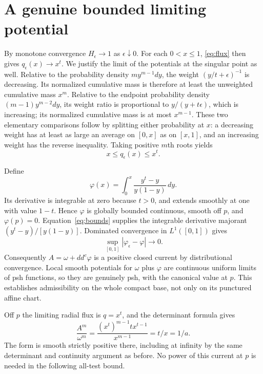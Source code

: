 \documentclass[11pt]{article}
\newcommand{\ddc}{dd^c}
\theoremstyle{remark}\newtheorem{remark}[theorem]{Remark}
\begin{document}
\section{A genuine bounded limiting potential}
By monotone convergence $H_\epsilon\to1$ as $\epsilon\downarrow0$.
For each $0<x\leq1$, \eqref{eq:flux} then gives
$q_\epsilon(x)\to x^t$.
We justify the limit of the potentials at the singular point as well.
Relative to the probability density $m y^{m-1}dy$, the weight
$(y/t+\epsilon)^{-1}$ is decreasing. Its normalized cumulative mass
is therefore at least the unweighted cumulative mass $x^m$.
Relative to the endpoint probability density $(m-1)y^{m-2}dy$, its weight
ratio is proportional to $y/(y+t\epsilon)$, which is increasing; its
normalized cumulative mass is at most $x^{m-1}$.
These two elementary comparisons follow by splitting either probability
at $x$: a decreasing weight has at least as large an average on $[0,x]$
as on $[x,1]$, and an increasing weight has the reverse inequality.
Taking positive $m$th roots yields
\begin{equation}\label{eq:bounds}
 x\leq q_\epsilon(x)\leq x^t.
\end{equation}

Define
\[
 \varphi(x)=\int_0^x\frac{y^t-y}{y(1-y)}\,dy.
\]
Its derivative is integrable at zero because $t>0$, and extends smoothly
at one with value $1-t$. Hence $\varphi$ is globally bounded continuous,
smooth off $p$, and $\varphi(p)=0$.
Equation~\eqref{eq:bounds} supplies the integrable derivative majorant
$(y^t-y)/[y(1-y)]$. Dominated convergence in $L^1([0,1])$ gives
\[
 \sup_{[0,1]}|\varphi_\epsilon-\varphi|\longrightarrow0.
\]
Consequently $A=\omega+\ddc\varphi$ is a positive closed current by
distributional convergence. Local smooth potentials for $\omega$ plus
$\varphi$ are continuous uniform limits of psh functions, so they are
genuinely psh, with the canonical value at $p$. This establishes admissibility
on the whole compact base, not only on its punctured affine chart.

Off $p$ the limiting radial flux is $q=x^t$, and the determinant formula
gives
\begin{equation}\label{eq:enddensity}
 \frac{A^m}{\omega^m}=
 \frac{(x^t)^{m-1}t x^{t-1}}{x^{m-1}}=t/x=1/a.
\end{equation}
The form is smooth strictly positive there, including at infinity by
the same determinant and continuity argument as before.
No power of this current at $p$ is needed in the following all-test bound.
\end{document}
